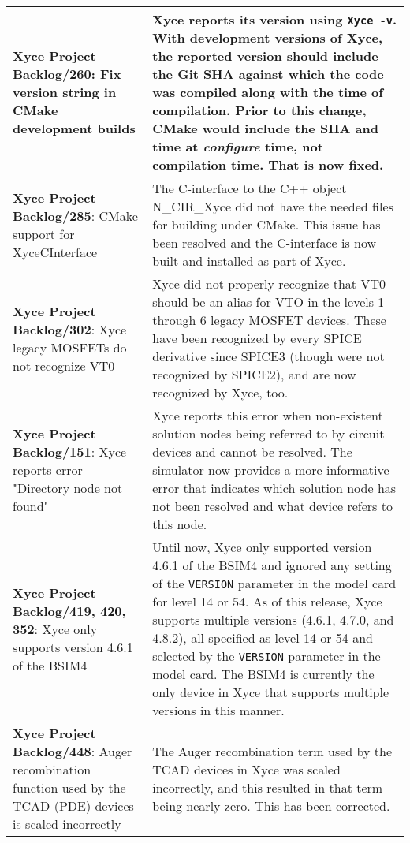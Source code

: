 {\begin{longtable}[h] {>{\raggedright\small}m{2in}|>{\raggedright\let\\\tabularnewline\small}m{3.5in}}
\textbf{Xyce Project Backlog/260}: Fix version string in CMake development builds &
Xyce reports its version using \texttt{Xyce -v}.  With development versions of
Xyce, the reported version should include the Git SHA against which the code
was compiled along with the time of compilation. Prior to this change, CMake
would include the SHA and time at \emph{configure} time, not compilation time.
That is now fixed. \\ \hline

\textbf{Xyce Project Backlog/285}: CMake support for XyceCInterface &
The C-interface to the C++ object N\_CIR\_Xyce did not have the needed
files for building under CMake.  This issue has been resolved and the 
C-interface is now built and installed as part of Xyce. \\ \hline

\textbf{Xyce Project Backlog/302}: Xyce legacy MOSFETs do not recognize VT0 &
Xyce did not properly recognize that VT0 should be an alias for VTO in
the levels 1 through 6 legacy MOSFET devices.  These have been
recognized by every SPICE derivative since SPICE3 (though were not
recognized by SPICE2), and are now recognized by Xyce, too. \\ \hline

\textbf{Xyce Project Backlog/151}: Xyce reports error "Directory node not found" &
Xyce reports this error when non-existent solution nodes being referred to
by circuit devices and cannot be resolved.  The simulator now provides a more
informative error that indicates which solution node has not been resolved and
what device refers to this node. \\ \hline

\textbf{Xyce Project Backlog/419, 420, 352}:  Xyce only supports version 4.6.1 of the BSIM4 &
Until now, Xyce only supported version 4.6.1 of the BSIM4 and ignored
any setting of the \texttt{VERSION} parameter in the model card for level
14 or 54.  As of this release, Xyce supports multiple versions (4.6.1,
4.7.0, and 4.8.2), all specified as level 14 or 54 and selected by
the \texttt{VERSION} parameter in the model card.  The BSIM4 is
currently the only device in Xyce that supports multiple versions in
this manner. \\ \hline


\textbf{Xyce Project Backlog/448}:  Auger recombination function used by
the TCAD (PDE) devices is scaled incorrectly & The Auger recombination
term used by the TCAD devices in Xyce was scaled incorrectly, and this
resulted in that term being nearly zero.  This has been corrected.
\\ \hline


\end{longtable}}
